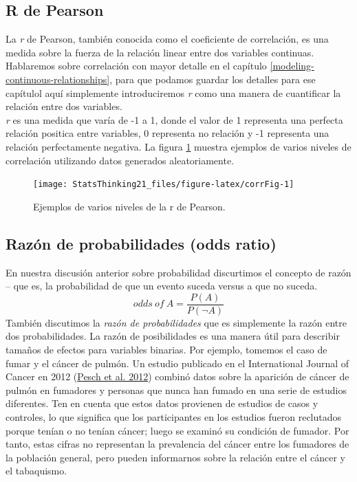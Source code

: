 \documentclass[
  12pt,
]{book}
\theoremstyle{definition}
\theoremstyle{definition}
\theoremstyle{definition}
\theoremstyle{remark}
\begin{document}
\hypertarget{r-de-pearson}{%
\subsection{R de Pearson}\label{r-de-pearson}}

La \emph{r} de Pearson, también conocida como el coeficiente de correlación, es una medida sobre la fuerza de la relación linear entre dos variables continuas. Hablaremos sobre correlación con mayor detalle en el capítulo \ref{modeling-continuous-relationships}, para que podamos guardar los detalles para ese capítulol aquí simplemente introduciremos \emph{r} como una manera de cuantificar la relación entre dos variables.\\
\emph{r} es una medida que varía de -1 a 1, donde el valor de 1 representa una perfecta relación positica entre variables, 0 representa no relación y -1 representa una relación perfectamente negativa. La figura \ref{fig:corrFig} muestra ejemplos de varios niveles de correlación utilizando datos generados aleatoriamente.

\begin{figure}
\texttt{[image: StatsThinking21\_files/figure-latex/corrFig-1]} \caption{Ejemplos de varios niveles de la r de Pearson.}\label{fig:corrFig}
\end{figure}

\hypertarget{razuxf3n-de-probabilidades-odds-ratio}{%
\subsection{Razón de probabilidades (odds ratio)}\label{razuxf3n-de-probabilidades-odds-ratio}}

En nuestra discusión anterior sobre probabilidad discurtimos el concepto de razón -- que es, la probabilidad de que un evento suceda versus a que no suceda.
\[
odds\ of\ A = \frac{P(A)}{P(\neg A)}
\]
También discutimos la \emph{razón de probabilidades} que es simplemente la razón entre dos probabilidades. La razón de posibilidades es una manera útil para describir tamaños de efectos para variables binarias.
Por ejemplo, tomemos el caso de fumar y el cáncer de pulmón. Un estudio publicado en el International Journal of Cancer en 2012 (\protect\hyperlink{ref-pesc:kend:gust:2012}{Pesch et al. 2012}) combinó datos sobre la aparición de cáncer de pulmón en fumadores y personas que nunca han fumado en una serie de estudios diferentes. Ten en cuenta que estos datos provienen de estudios de casos y controles, lo que significa que los participantes en los estudios fueron reclutados porque tenían o no tenían cáncer; luego se examinó su condición de fumador. Por tanto, estas cifras no representan la prevalencia del cáncer entre los fumadores de la población general, pero pueden informarnos sobre la relación entre el cáncer y el tabaquismo.
\end{document}
